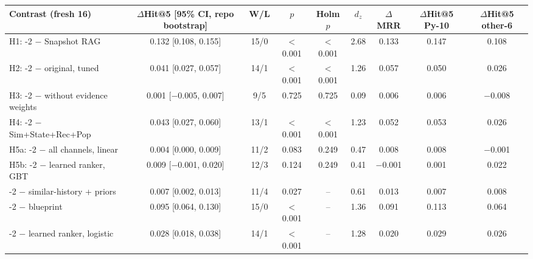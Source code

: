 \begin{tabular}{lccccc|ccc}
\toprule
Contrast (fresh 16) & $\Delta$Hit@5 [95\% CI, repo bootstrap] & W/L & $p$ & Holm $p$ & $d_z$ & $\Delta$MRR & $\Delta$Hit@5 Py-10 & $\Delta$Hit@5 other-6 \\
\midrule
H1: \sys{}-2 $-$ Snapshot RAG & 0.132 [0.108, 0.155] & 15/0 & $<$0.001 & $<$0.001 & 2.68 & 0.133 & 0.147 & 0.108 \\
H2: \sys{}-2 $-$ original, tuned & 0.041 [0.027, 0.057] & 14/1 & $<$0.001 & $<$0.001 & 1.26 & 0.057 & 0.050 & 0.026 \\
H3: \sys{}-2 $-$ without evidence weights & 0.001 [$-$0.005, 0.007] & 9/5 & 0.725 & 0.725 & 0.09 & 0.006 & 0.006 & $-$0.008 \\
H4: \sys{}-2 $-$ Sim+State+Rec+Pop & 0.043 [0.027, 0.060] & 13/1 & $<$0.001 & $<$0.001 & 1.23 & 0.052 & 0.053 & 0.026 \\
H5a: \sys{}-2 $-$ all channels, linear & 0.004 [0.000, 0.009] & 11/2 & 0.083 & 0.249 & 0.47 & 0.008 & 0.008 & $-$0.001 \\
H5b: \sys{}-2 $-$ learned ranker, GBT & 0.009 [$-$0.001, 0.020] & 12/3 & 0.124 & 0.249 & 0.41 & $-$0.001 & 0.001 & 0.022 \\
\midrule
\sys{}-2 $-$ similar-history + priors & 0.007 [0.002, 0.013] & 11/4 & 0.027 & -- & 0.61 & 0.013 & 0.007 & 0.008 \\
\sys{}-2 $-$ blueprint & 0.095 [0.064, 0.130] & 15/0 & $<$0.001 & -- & 1.36 & 0.091 & 0.113 & 0.064 \\
\sys{}-2 $-$ learned ranker, logistic & 0.028 [0.018, 0.038] & 14/1 & $<$0.001 & -- & 1.28 & 0.020 & 0.029 & 0.026 \\
\bottomrule
\end{tabular}